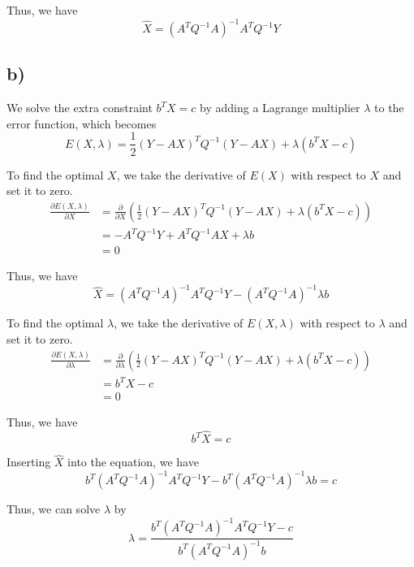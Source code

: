 \documentclass[a4paper,12pt]{article}
\newcommand{\pard}[2]{\frac{\partial #1}{\partial #2}}
\begin{document}
Thus, we have
\begin{equation*}
	\hat{X} = (A^T Q^{-1} A)^{-1} A^T Q^{-1} Y
\end{equation*}

\subsection*{b)}

We solve the extra constraint $b^T X = c$ by adding a Lagrange multiplier $\lambda$ to the error function, which becomes
\begin{equation*}
	E(X, \lambda) = \frac{1}{2} (Y - AX)^T Q^{-1} (Y - AX) + \lambda (b^T X - c)
\end{equation*}

To find the optimal $X$, we take the derivative of $E(X)$ with respect to $X$ and set it to zero.
\begin{align*}
	\pard{E(X, \lambda)}{X} &= \pard{}{X} \left( \frac{1}{2} (Y - AX)^T Q^{-1} (Y - AX) + \lambda (b^T X - c) \right) \\
	&= - A^T Q^{-1} Y + A^T Q^{-1} A X + \lambda b \\
	&= 0
\end{align*}

Thus, we have
\begin{equation*}
	\hat{X} = (A^T Q^{-1} A)^{-1} A^T Q^{-1} Y - (A^T Q^{-1} A)^{-1} \lambda b
\end{equation*}

To find the optimal $\lambda$, we take the derivative of $E(X, \lambda)$ with respect to $\lambda$ and set it to zero.
\begin{align*}
	\pard{E(X, \lambda)}{\lambda} &= \pard{}{\lambda} \left( \frac{1}{2} (Y - AX)^T Q^{-1} (Y - AX) + \lambda (b^T X - c) \right) \\
	&= b^T X - c \\
	&= 0
\end{align*}

Thus, we have
\begin{equation*}
	b^T \hat{X} = c
\end{equation*}

Inserting $\hat{X}$ into the equation, we have
\begin{equation*}
	b^T (A^T Q^{-1} A)^{-1} A^T Q^{-1} Y - b^T (A^T Q^{-1} A)^{-1} \lambda b = c
\end{equation*}

Thus, we can solve $\lambda$ by
\begin{equation*}
	\lambda = \frac{b^T (A^T Q^{-1} A)^{-1} A^T Q^{-1} Y - c}{b^T (A^T Q^{-1} A)^{-1} b}
\end{equation*}
\end{document}
